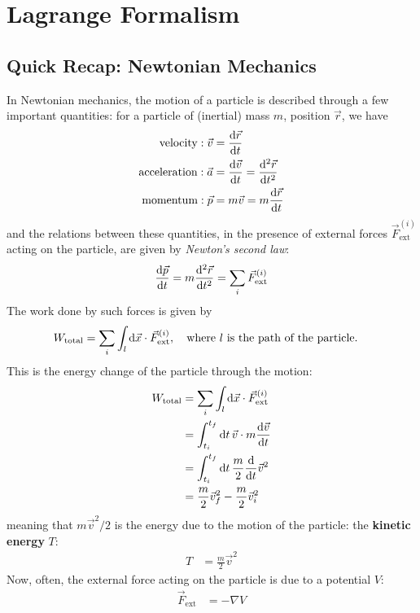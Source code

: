 \section{Lagrange Formalism}
\subsection{Quick Recap: Newtonian Mechanics}
In Newtonian mechanics, the motion of a particle is described through a few important quantities:
for a particle of (inertial) mass $m$, position $\vec{r}$, we have
\begin{align}
  \text{velocity}: \vec{v}     & = \odv{\vec{r}}{t}                       \\
  \text{acceleration}: \vec{a} & = \odv{\vec{v}}{t} = \odv[2]{\vec{r}}{t} \\
  \text{momentum}: \vec{p}     & = m\vec{v} = m\odv{\vec{r}}{t}
\end{align}
and the relations between these quantities, in the presence of external forces $\vec{F}_{\text{ext}}^{(i)}$ acting on the particle, are given by \textit{Newton's second law}:
\begin{align}
  \odv{\vec{p}}{t} = m \odv[2]{\vec{r}}{t} = \sum_i \vec{F}_{\text{ext}}^{(i)}
\end{align}
The work done by such forces is given by
\begin{align}
  W_{\text{total}} & = \sum_i \int_l \odif{\vec{x}} \cdot \vec{F}_{\text{ext}}^{(i)}, \quad \text{where } l \text{ is the path of the particle.}
\end{align}
This is the energy change of the particle through the motion:
\begin{align}
  W_{\text{total}}
   & = \sum_i \int_l \odif{\vec{x}} \cdot \vec{F}_{\text{ext}}^{(i)} \\
   & = \int_{t_i}^{t_f} \odif{t} \, \vec{v} \cdot m \odv{\vec{v}}{t} \\
   & = \int_{t_i}^{t_f} \odif{t} \, \frac{m}{2} \odv{}{t} \vec{v}^2  \\
   & = \frac{m}{2} \vec{v}_f^2 - \frac{m}{2} \vec{v}_i^2
\end{align}
meaning that $m \vec{v}^2 / 2$ is the energy due to the motion of the particle: the \textbf{kinetic energy} $T$:
\begin{align}
  T & = \frac{m}{2} \vec{v}^2
\end{align}
Now, often, the external force acting on the particle is due to a potential $V$:
\begin{align}
  \vec{F}_{\text{ext}} & = -\nabla V
\end{align}
